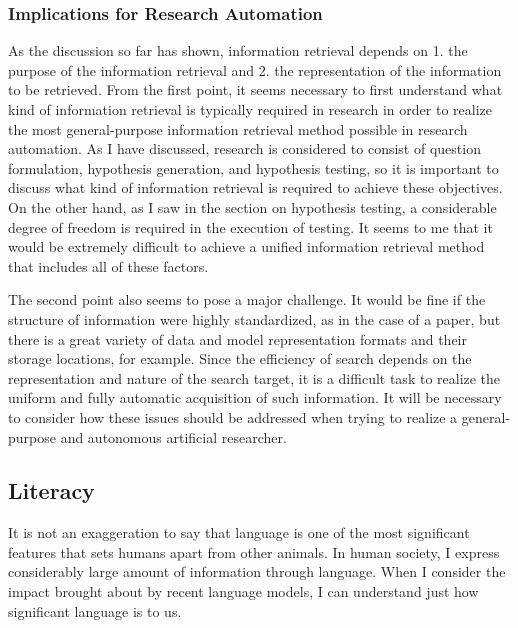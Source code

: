 \documentclass{book}
\begin{document}
\subsubsection{Implications for Research Automation}
As the discussion so far has shown, information retrieval depends on 1. the purpose of the information retrieval and 2. the representation of the information to be retrieved. From the first point, it seems necessary to first understand what kind of information retrieval is typically required in research in order to realize the most general-purpose information retrieval method possible in research automation. As I have discussed, research is considered to consist of question formulation, hypothesis generation, and hypothesis testing, so it is important to discuss what kind of information retrieval is required to achieve these objectives. On the other hand, as I saw in the section on hypothesis testing, a considerable degree of freedom is required in the execution of testing. It seems to me that it would be extremely difficult to achieve a unified information retrieval method that includes all of these factors.

The second point also seems to pose a major challenge. It would be fine if the structure of information were highly standardized, as in the case of a paper, but there is a great variety of data and model representation formats and their storage locations, for example. Since the efficiency of search depends on the representation and nature of the search target, it is a difficult task to realize the uniform and fully automatic acquisition of such information. It will be necessary to consider how these issues should be addressed when trying to realize a general-purpose and autonomous artificial researcher.



\subsection{Literacy}

It is not an exaggeration to say that language is one of the most significant features that sets humans apart from other animals. In human society, I express considerably large amount of information through language. When I consider the impact brought about by recent language models, I can understand just how significant language is to us.
\end{document}
